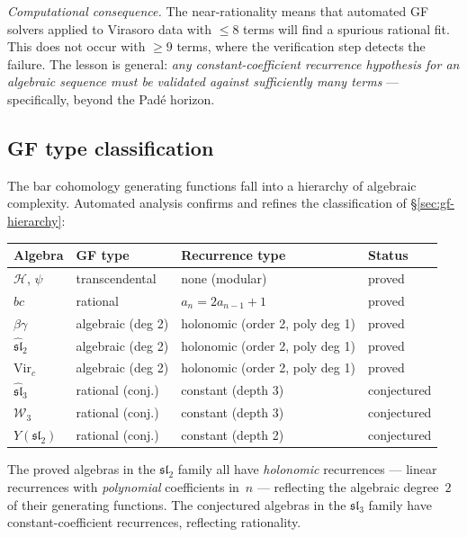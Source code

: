 \emph{Computational consequence.}  The near-rationality means that
automated GF solvers applied to Virasoro data with $\leq 8$ terms
will find a spurious rational fit.  This does not occur with $\geq 9$
terms, where the verification step detects the failure.  The lesson
is general: \emph{any constant-coefficient recurrence hypothesis
for an algebraic sequence must be validated against sufficiently
many terms} --- specifically, beyond the Padé horizon.

\subsection{GF type classification}
\label{subsec:gf-type-classification}

The bar cohomology generating functions fall into a hierarchy of
algebraic complexity.  Automated analysis confirms and refines the
classification of \S\ref{sec:gf-hierarchy}:

\begin{center}
\renewcommand{\arraystretch}{1.3}
\begin{tabular}{llll}
\toprule
\textbf{Algebra} & \textbf{GF type} & \textbf{Recurrence type} &
  \textbf{Status} \\
\midrule
$\mathcal{H}$, $\psi$ & transcendental & none (modular) & proved \\
$bc$ & rational & $a_n = 2a_{n-1} + 1$ & proved \\
$\beta\gamma$ & algebraic (deg 2) & holonomic (order 2, poly deg 1) & proved \\
$\widehat{\mathfrak{sl}}_2$ & algebraic (deg 2) & holonomic (order 2, poly deg 1) & proved \\
$\mathrm{Vir}_c$ & algebraic (deg 2) & holonomic (order 2, poly deg 1) & proved \\
$\widehat{\mathfrak{sl}}_3$ & rational (conj.) & constant (depth 3) & conjectured \\
$\mathcal{W}_3$ & rational (conj.) & constant (depth 3) & conjectured \\
$Y(\mathfrak{sl}_2)$ & rational (conj.) & constant (depth 2) & conjectured \\
\bottomrule
\end{tabular}
\end{center}

The proved algebras in the $\mathfrak{sl}_2$ family all have
\emph{holonomic} recurrences --- linear recurrences with
\emph{polynomial} coefficients in~$n$ --- reflecting the algebraic
degree~$2$ of their generating functions.  The conjectured algebras
in the $\mathfrak{sl}_3$ family have constant-coefficient recurrences,
reflecting rationality.

